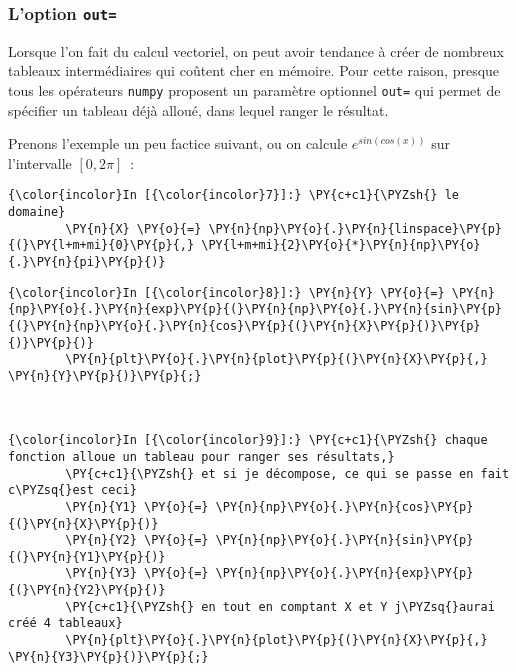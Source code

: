     \hypertarget{loption-out}{%
\subsubsection{\texorpdfstring{L'option
\texttt{out=}}{L'option out=}}\label{loption-out}}

    Lorsque l'on fait du calcul vectoriel, on peut avoir tendance à créer de
nombreux tableaux intermédiaires qui coûtent cher en mémoire. Pour cette
raison, presque tous les opérateurs \texttt{numpy} proposent un
paramètre optionnel \texttt{out=} qui permet de spécifier un tableau
déjà alloué, dans lequel ranger le résultat.

    Prenons l'exemple un peu factice suivant, ou on calcule
\(e^{sin(cos(x))}\) sur l'intervalle \([0, 2\pi]\)~:

    \begin{Verbatim}[commandchars=\\\{\},frame=single,framerule=0.3mm,rulecolor=\color{cellframecolor}]
{\color{incolor}In [{\color{incolor}7}]:} \PY{c+c1}{\PYZsh{} le domaine}
        \PY{n}{X} \PY{o}{=} \PY{n}{np}\PY{o}{.}\PY{n}{linspace}\PY{p}{(}\PY{l+m+mi}{0}\PY{p}{,} \PY{l+m+mi}{2}\PY{o}{*}\PY{n}{np}\PY{o}{.}\PY{n}{pi}\PY{p}{)}
\end{Verbatim}


    \begin{Verbatim}[commandchars=\\\{\},frame=single,framerule=0.3mm,rulecolor=\color{cellframecolor}]
{\color{incolor}In [{\color{incolor}8}]:} \PY{n}{Y} \PY{o}{=} \PY{n}{np}\PY{o}{.}\PY{n}{exp}\PY{p}{(}\PY{n}{np}\PY{o}{.}\PY{n}{sin}\PY{p}{(}\PY{n}{np}\PY{o}{.}\PY{n}{cos}\PY{p}{(}\PY{n}{X}\PY{p}{)}\PY{p}{)}\PY{p}{)}
        \PY{n}{plt}\PY{o}{.}\PY{n}{plot}\PY{p}{(}\PY{n}{X}\PY{p}{,} \PY{n}{Y}\PY{p}{)}\PY{p}{;}
\end{Verbatim}


    \begin{center}
    \end{center}
    { \hspace*{\fill} \\}
    
    \begin{Verbatim}[commandchars=\\\{\},frame=single,framerule=0.3mm,rulecolor=\color{cellframecolor}]
{\color{incolor}In [{\color{incolor}9}]:} \PY{c+c1}{\PYZsh{} chaque fonction alloue un tableau pour ranger ses résultats,}
        \PY{c+c1}{\PYZsh{} et si je décompose, ce qui se passe en fait c\PYZsq{}est ceci}
        \PY{n}{Y1} \PY{o}{=} \PY{n}{np}\PY{o}{.}\PY{n}{cos}\PY{p}{(}\PY{n}{X}\PY{p}{)}
        \PY{n}{Y2} \PY{o}{=} \PY{n}{np}\PY{o}{.}\PY{n}{sin}\PY{p}{(}\PY{n}{Y1}\PY{p}{)}
        \PY{n}{Y3} \PY{o}{=} \PY{n}{np}\PY{o}{.}\PY{n}{exp}\PY{p}{(}\PY{n}{Y2}\PY{p}{)}
        \PY{c+c1}{\PYZsh{} en tout en comptant X et Y j\PYZsq{}aurai créé 4 tableaux}
        \PY{n}{plt}\PY{o}{.}\PY{n}{plot}\PY{p}{(}\PY{n}{X}\PY{p}{,} \PY{n}{Y3}\PY{p}{)}\PY{p}{;}
\end{Verbatim}


